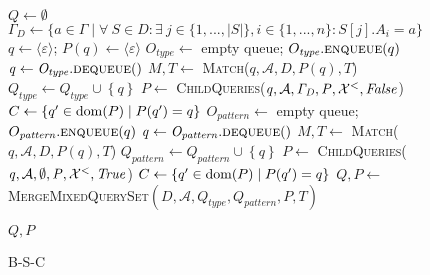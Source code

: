 \begin{figure}[t]
	\removelatexerror
	\begin{algorithm}[H]
	\footnotesize
    \caption{B-S-C}
    \label{alg-bu-bf}
	\BlankLine
	$\mathit{Q \leftarrow \emptyset}$\;
	$\Gamma_D \gets \{a \in \Gamma \mid \forall \ S \in D: \exists \
	j\in\{1,...,|S|\}, i\in\{1,...,n\}: S[j].A_i = a\}$\;
	$q \gets\langle\varepsilon\rangle$; $P(q) \gets
	\langle\varepsilon\rangle$\;
    $O_{\mathit{type}} \leftarrow$ empty queue;
    $O_{\mathit{type}}.\textsc{enqueue}(q)$\;
    {
    	\label{alg6:while_type_start}
    	$\mathit{q \leftarrow O_{type}}.\textsc{dequeue}()$\;
        $\mathit{M,T \leftarrow}$ \textsc{Match}($\mathit{q,\mathcal{A},D,
        P(q),T}$)\;
        {   $\mathit{Q_{type} \leftarrow Q_{type} \cup \left\{q\right\} }$\;
            $\mathit{P \leftarrow}$
            \textsc{ChildQueries}($\mathit{q,\mathcal{A},\Gamma_D,
            P,\mathcal{X}^<,
            \mathit{False}}$)\;
			${C} \leftarrow  \{q'\in \operatorname{dom}(P) \mid P(q')=q\}$\;
        }
    	\label{alg6:while_type_end}
    }
	$O_{\mathit{pattern}} \leftarrow$ empty queue;
	$O_{\mathit{pattern}}.\textsc{enqueue}(q)$\;
    {
    	\label{alg6:while_pattern_start}
    	$\mathit{q \leftarrow O_{pattern}}.\textsc{dequeue}()$\;
        $\mathit{M,T \leftarrow}$
        \textsc{Match}($\mathit{q,\mathcal{A},D,P(q),T}$)\;
        {   $\mathit{Q_{pattern} \leftarrow Q_{pattern} \cup \left\{q\right\} }$\;
            $\mathit{P \leftarrow}$
            \textsc{ChildQueries}($\mathit{q,\mathcal{A},\emptyset,P,
            \mathcal{X}^<,\mathit{True}}$)\;
			${C} \leftarrow  \{q'\in \operatorname{dom}(P) \mid P(q')=q\}$\;
        }
    	\label{alg6:while_pattern_end}
    }
    $Q,P \leftarrow$ \textsc{MergeMixedQuerySet}$({D}, \mathcal{A},
    Q_{\mathit{type}},
    Q_{\mathit{pattern}}, P, T)$\;
    
    
    {\Return $\mathit{Q,P}$}
\end{algorithm}
\vspace{-1em}
\end{figure}
